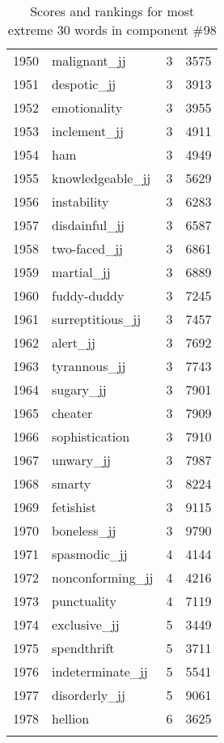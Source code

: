\begin{longtable}[!htbp]{| rlr@{.}l |}
    1950 & malignant\_jj & 3 & 3575 \\
    1951 & despotic\_jj & 3 & 3913 \\
    1952 & emotionality & 3 & 3955 \\
    1953 & inclement\_jj & 3 & 4911 \\
    1954 & ham & 3 & 4949 \\
    1955 & knowledgeable\_jj & 3 & 5629 \\
    1956 & instability & 3 & 6283 \\
    1957 & disdainful\_jj & 3 & 6587 \\
    1958 & two-faced\_jj & 3 & 6861 \\
    1959 & martial\_jj & 3 & 6889 \\
    1960 & fuddy-duddy & 3 & 7245 \\
    1961 & surreptitious\_jj & 3 & 7457 \\
    1962 & alert\_jj & 3 & 7692 \\
    1963 & tyrannous\_jj & 3 & 7743 \\
    1964 & sugary\_jj & 3 & 7901 \\
    1965 & cheater & 3 & 7909 \\
    1966 & sophistication & 3 & 7910 \\
    1967 & unwary\_jj & 3 & 7987 \\
    1968 & smarty & 3 & 8224 \\
    1969 & fetishist & 3 & 9115 \\
    1970 & boneless\_jj & 3 & 9790 \\
    1971 & spasmodic\_jj & 4 & 4144 \\
    1972 & nonconforming\_jj & 4 & 4216 \\
    1973 & punctuality & 4 & 7119 \\
    1974 & exclusive\_jj & 5 & 3449 \\
    1975 & spendthrift & 5 & 3711 \\
    1976 & indeterminate\_jj & 5 & 5541 \\
    1977 & disorderly\_jj & 5 & 9061 \\
    1978 & hellion & 6 & 3625 \\
    \hline
    \caption{Scores and rankings for most extreme 30 words in component \#98} \\
\end{longtable}
